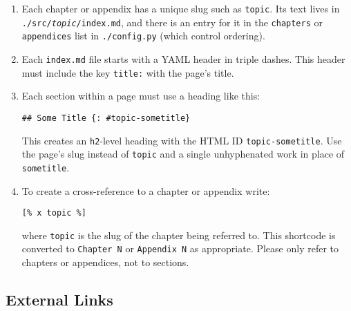\documentclass[krantzl]{krantz}
\begin{document}
\begin{enumerate}

\item 

Each chapter or appendix has a unique slug such as \texttt{topic}.
    Its text lives in \texttt{./src/\emph{topic}/index.md},
    and there is an entry for it in the \texttt{chapters} or \texttt{appendices} list in \texttt{./config.py}
    (which control ordering).



\item 

Each \texttt{index.md} file starts with a YAML header in triple dashes.
    This header must include the key \texttt{title:} with the page's title.



\item 

Each section within a page must use a heading like this:

\begin{lstlisting}[frame=single,frameround=tttt]
## Some Title {: #topic-sometitle}
\end{lstlisting}


This creates an \texttt{h2}-level heading with the HTML ID \texttt{topic-sometitle}.
Use the page's slug instead of \texttt{topic} and a single unhyphenated work
in place of \texttt{sometitle}.



\item 

To create a cross-reference to a chapter or appendix write:

\begin{lstlisting}[frame=single,frameround=tttt]
[% x topic %]
\end{lstlisting}


where \texttt{topic} is the slug of the chapter being referred to.
This shortcode is converted to \texttt{Chapter N} or \texttt{Appendix N} as appropriate.
Please only refer to chapters or appendices, not to sections.



\end{enumerate}

\subsection*{External Links}
\end{document}
